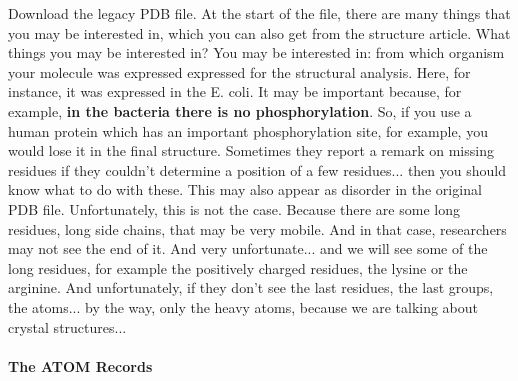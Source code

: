 Download the legacy PDB file. At the start of the file, there are many things that you may be interested in, which you can also get from the structure article. What things you may be interested in?  You may be interested in: from which organism your molecule was expressed expressed for the structural analysis. Here, for instance, it was expressed in the E. coli. It may be important because, for example, \textbf{in the bacteria there is no phosphorylation}. So, if you use a human protein which has an important phosphorylation site, for example, you would lose it in the final structure. Sometimes they report a remark on missing residues if they couldn't determine a position of a few residues... then you should know what to do with these. This may also appear as disorder in the original PDB file. Unfortunately, this is not the case. Because there are some long residues, long side chains, that may be very mobile. And in that case, researchers may not see the end of it. And very unfortunate... and we will see some of the long residues, for example the positively charged residues, the lysine or the arginine. And unfortunately, if they don't see the last residues, the last groups, the atoms... by the way, only the heavy atoms, because we are talking about crystal structures...

\paragraph{The ATOM Records}


